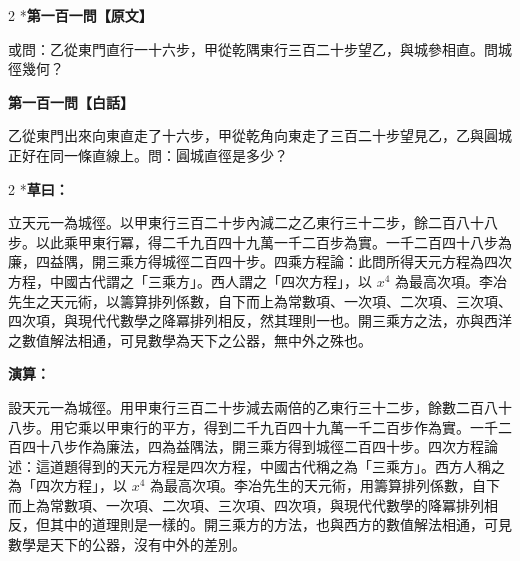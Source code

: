 \documentclass[11pt,a4paper]{article}
\begin{document}
\vspace{0.1cm}
\noindent{}
\par\vspace{0.3cm}

\begin{paracol}{2}
\switchcolumn[0]*\noindent\textbf{第一百一問【原文】}

\small 或問：乙從東門直行一十六步，甲從乾隅東行三百二十步望乙，與城參相直。問城徑幾何？

\switchcolumn\noindent\textbf{第一百一問【白話】}

\small 乙從東門出來向東直走了十六步，甲從乾角向東走了三百二十步望見乙，乙與圓城正好在同一條直線上。問：圓城直徑是多少？
\end{paracol}

\vspace{0.1cm}
\noindent{}
\par\vspace{0.15cm}

\begin{paracol}{2}
\switchcolumn[0]*\textbf{草曰：}

\small 立天元一為城徑。以甲東行三百二十步內減二之乙東行三十二步，餘二百八十八步。以此乘甲東行冪，得二千九百四十九萬一千二百步為實。一千二百四十八步為廉，四益隅，開三乘方得城徑二百四十步。四乘方程論：此問所得天元方程為四次方程，中國古代謂之「三乘方」。西人謂之「四次方程」，以 $x^4$ 為最高次項。李冶先生之天元術，以籌算排列係數，自下而上為常數項、一次項、二次項、三次項、四次項，與現代代數學之降冪排列相反，然其理則一也。開三乘方之法，亦與西洋之數值解法相通，可見數學為天下之公器，無中外之殊也。

\switchcolumn\textbf{演算：}

\small 設天元一為城徑。用甲東行三百二十步減去兩倍的乙東行三十二步，餘數二百八十八步。用它乘以甲東行的平方，得到二千九百四十九萬一千二百步作為實。一千二百四十八步作為廉法，四為益隅法，開三乘方得到城徑二百四十步。四次方程論述：這道題得到的天元方程是四次方程，中國古代稱之為「三乘方」。西方人稱之為「四次方程」，以 $x^4$ 為最高次項。李冶先生的天元術，用籌算排列係數，自下而上為常數項、一次項、二次項、三次項、四次項，與現代代數學的降冪排列相反，但其中的道理則是一樣的。開三乘方的方法，也與西方的數值解法相通，可見數學是天下的公器，沒有中外的差別。
\end{paracol}
\end{document}

